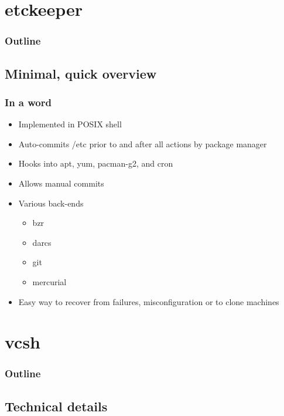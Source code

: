 \documentclass[t]{beamer}
\begin{document}
\section{etckeeper}

\begin{frame}
	\frametitle{Outline}
	\tableofcontents[currentsection]
\end{frame}

\subsection{Minimal, quick overview}

\begin{frame}
	\frametitle{In a word}
	\begin{itemize}
		\item Implemented in POSIX shell
		\item Auto-commits /etc prior to and after all actions by package manager
		\item Hooks into apt, yum, pacman-g2, and cron
		\item Allows manual commits
		\item Various back-ends
		\begin{itemize}
			\item bzr
			\item darcs
			\item git
			\item mercurial
		\end{itemize}
		\item Easy way to recover from failures, misconfiguration or to clone machines
	\end{itemize}
\end{frame}


\section{vcsh}
\begin{frame}
	\frametitle{Outline}
	\tableofcontents[currentsection]
\end{frame}

\subsection{Technical details}
\end{document}

